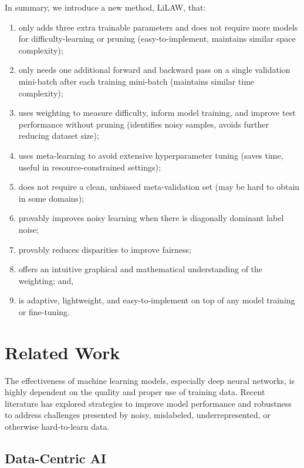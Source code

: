 \documentclass{article}
\theoremstyle{plain}
\theoremstyle{definition}
\theoremstyle{remark}
\begin{document}
In summary, we introduce a new method, LiLAW, that:
\vspace{-1em}
\begin{enumerate}[leftmargin=*,labelindent=0pt,label=\textbf{--}]
    \itemsep-0.4em 
    \item only adds three extra trainable parameters and does not require more models for difficulty-learning or pruning (easy-to-implement, maintains similar space complexity);
    \item only needs one additional forward and backward pass on a single validation mini-batch after each training mini-batch (maintains similar time complexity);
    \item uses weighting to measure difficulty, inform model training, and improve test performance without pruning (identifies noisy samples, avoids further reducing dataset size);
    \item uses meta-learning to avoid extensive hyperparameter tuning (saves time, useful in resource-constrained settings);
    \item does not require a clean, unbiased meta-validation set (may be hard to obtain in some domains);
    \item provably improves noisy learning when there is diagonally dominant label noise;
    \item provably reduces disparities to improve fairness;
    \item offers an intuitive graphical and mathematical understanding of the weighting; and,
    \item is adaptive, lightweight, and easy-to-implement on top of any model training or fine-tuning.
\end{enumerate}

\section{Related Work}
\label{sec:relatedwork}

The effectiveness of machine learning models, especially deep neural networks, is highly dependent on the quality and proper use of training data. Recent literature has explored strategies to improve model performance and robustness to address challenges presented by noisy, mislabeled, underrepresented, or otherwise hard-to-learn data.

\subsection{Data-Centric AI}
\end{document}
